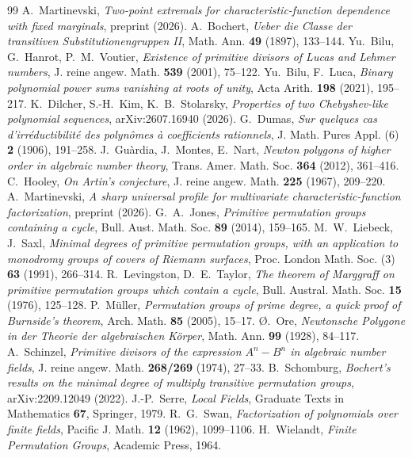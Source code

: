 \documentclass[11pt]{amsart}
\theoremstyle{definition}\newtheorem{definition}[theorem]{Definition}\newtheorem{example}[theorem]{Example}
\theoremstyle{remark}\newtheorem{remark}[theorem]{Remark}
\begin{document}
\begin{thebibliography}{99}
 A.~Martinevski, \emph{Two-point extremals for characteristic-function dependence with fixed marginals}, preprint (2026).
 A.~Bochert, \emph{Ueber die Classe der transitiven Substitutionengruppen II}, Math. Ann. \textbf{49} (1897), 133--144.
 Yu.~Bilu, G.~Hanrot, P.~M.~Voutier, \emph{Existence of primitive divisors of Lucas and Lehmer numbers}, J. reine angew. Math.
\textbf{539} (2001), 75--122.
 Yu.~Bilu, F.~Luca, \emph{Binary polynomial power sums vanishing at roots of unity}, Acta Arith. \textbf{198} (2021), 195--217.
 K.~Dilcher, S.-H.~Kim, K.~B.~Stolarsky, \emph{Properties of two Chebyshev-like polynomial sequences}, arXiv:2607.16940 (2026).
 G.~Dumas, \emph{Sur quelques cas d'irr\'eductibilit\'e des polyn\^omes \`a coefficients rationnels}, J. Math. Pures Appl. (6)
\textbf{2} (1906), 191--258.
 J.~Gu\`ardia, J.~Montes, E.~Nart, \emph{Newton polygons of higher order in algebraic number theory}, Trans. Amer. Math. Soc.
\textbf{364} (2012), 361--416.
 C.~Hooley, \emph{On Artin's conjecture}, J. reine angew. Math. \textbf{225} (1967), 209--220.
 A.~Martinevski, \emph{A sharp universal profile for multivariate characteristic-function factorization}, preprint (2026).
 G.~A.~Jones, \emph{Primitive permutation groups containing a cycle}, Bull. Aust. Math. Soc. \textbf{89} (2014), 159--165.
 M.~W.~Liebeck, J.~Saxl, \emph{Minimal degrees of primitive permutation groups, with an application to monodromy groups of covers of
Riemann surfaces}, Proc. London Math. Soc. (3) \textbf{63} (1991), 266--314.
 R.~Levingston, D.~E.~Taylor, \emph{The theorem of Marggraff on primitive permutation groups which contain a cycle}, Bull. Austral. Math.
Soc. \textbf{15} (1976), 125--128.
 P.~M\"uller, \emph{Permutation groups of prime degree, a quick proof of Burnside's theorem}, Arch. Math. \textbf{85} (2005), 15--17.
 \O.~Ore, \emph{Newtonsche Polygone in der Theorie der algebraischen K\"orper}, Math. Ann. \textbf{99} (1928), 84--117.
 A.~Schinzel, \emph{Primitive divisors of the expression $A^n-B^n$ in algebraic number fields}, J. reine angew. Math.
\textbf{268/269} (1974), 27--33.
 B.~Schomburg, \emph{Bochert's results on the minimal degree of multiply transitive permutation groups}, arXiv:2209.12049 (2022).
 J.-P.~Serre, \emph{Local Fields}, Graduate Texts in Mathematics \textbf{67}, Springer, 1979.
 R.~G.~Swan, \emph{Factorization of polynomials over finite fields}, Pacific J. Math. \textbf{12} (1962), 1099--1106.
 H.~Wielandt, \emph{Finite Permutation Groups}, Academic Press, 1964.
\end{thebibliography}
\end{document}
